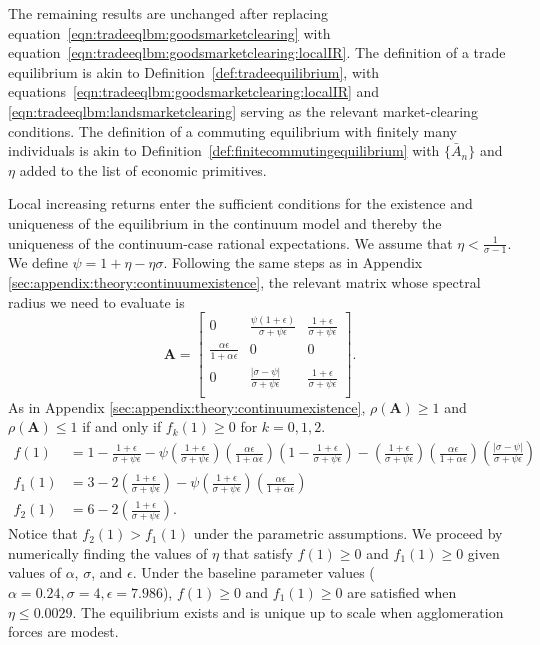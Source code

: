 \documentclass[11pt]{article}
\theoremstyle{definition}
\begin{document}
The remaining results are unchanged after replacing equation~\eqref{eqn:tradeeqlbm:goodsmarketclearing}
with equation~\eqref{eqn:tradeeqlbm:goodsmarketclearing:localIR}.
The definition of a trade equilibrium is akin to Definition~\ref{def:tradeequilibrium},
with equations~\eqref{eqn:tradeeqlbm:goodsmarketclearing:localIR} and \eqref{eqn:tradeeqlbm:landsmarketclearing} 
serving as the relevant market-clearing conditions.
The definition of a commuting equilibrium with finitely many individuals is akin to Definition~\ref{def:finitecommutingequilibrium} with $\{\bar{A}_{n}\}$ and $\eta$ added to the list of economic primitives.

Local increasing returns enter the sufficient conditions for the existence and uniqueness of the equilibrium in the continuum model and thereby the uniqueness of the continuum-case rational expectations.
We assume that $\eta < \frac{1}{\sigma-1}$.
We define  $\psi = 1+\eta-\eta\sigma$.
Following the same steps as in Appendix \ref{sec:appendix:theory:continuumexistence},
the relevant matrix whose spectral radius we need to evaluate is
\begin{equation*}
 \mathbf{A} =
    \begin{bmatrix}
        0 & \frac{\psi(1+\epsilon)}{\sigma + \psi\epsilon} & \frac{1+\epsilon}{\sigma + \psi\epsilon} \\
        \frac{\alpha \epsilon}{1 + \alpha \epsilon} & 0 & 0 \\
        0 & \frac{|\sigma-\psi|}{\sigma + \psi\epsilon} & \frac{1+\epsilon}{\sigma + \psi\epsilon} \\
    \end{bmatrix}
.\end{equation*}
As in Appendix \ref{sec:appendix:theory:continuumexistence}, $\rho(\mathbf{A}) \geq 1$ and $\rho(\mathbf{A}) \leq 1$ if and only if $f_k(1) \geq 0$ for $k = 0,1,2$.  
\begin{align*}
  f(1) &=
  1 - \frac{1+\epsilon}{\sigma + \psi\epsilon} - \psi \left(\frac{1+\epsilon}{\sigma + \psi\epsilon} \right)
  \left(\frac{\alpha\epsilon}{1+\alpha\epsilon}\right) \left(1 - \frac{1+\epsilon}{\sigma + \psi\epsilon}\right) - 
  \left(\frac{1+\epsilon}{\sigma + \psi\epsilon}\right) \left(\frac{\alpha\epsilon}{1+\alpha\epsilon}\right) \left(\frac{|\sigma - \psi|}{\sigma + \psi\epsilon}\right) \\
  f_1(1) &= 3 - 2 \left( \frac{1+\epsilon}{\sigma + \psi\epsilon}  \right) - 
  \psi \left(\frac{1+\epsilon}{\sigma + \psi\epsilon} \right) \left(\frac{\alpha\epsilon}{1+\alpha\epsilon}\right) \\
  f_2(1) &= 6 - 2 \left( \frac{1+\epsilon}{\sigma + \psi\epsilon}  \right).
\end{align*}
Notice that $f_2(1) > f_1(1)$ under the parametric assumptions. 
We proceed by numerically finding the values of $\eta$ 
that satisfy $f(1) \geq 0$ and $f_1(1) \geq 0$ given values of $\alpha$, $\sigma$, and $\epsilon$.
Under the baseline parameter values ($\alpha=0.24,\sigma=4,\epsilon=7.986$),
$f(1) \geq 0$ and $f_1(1) \geq 0$ are satisfied when $\eta \leq 0.0029$.
The equilibrium exists and is unique up to scale when agglomeration forces are modest.
\end{document}
